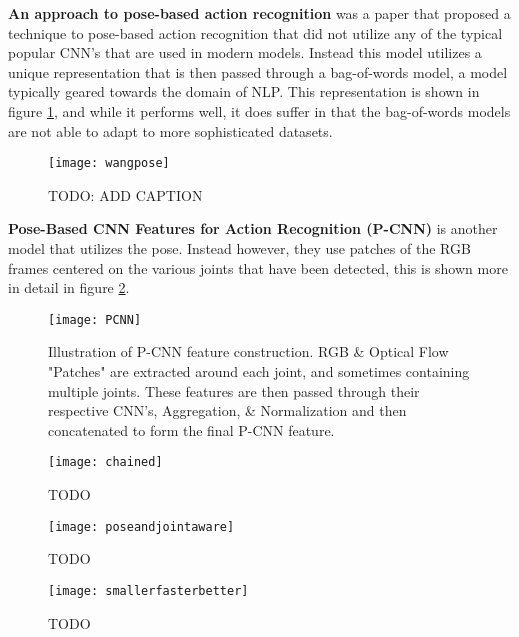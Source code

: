 \textbf{An approach to pose-based action recognition} \cite{WangPose} was a paper that proposed a technique to pose-based action recognition that did not utilize any of the typical popular CNN's that are used in modern models. Instead this model utilizes a unique representation that is then passed through a bag-of-words model, a model typically geared towards the domain of NLP. This representation is shown in figure \ref{fig:wangpose}, and  while it performs well, it does suffer in that the bag-of-words models are not able to adapt to more sophisticated datasets.

\begin{figure}[h]
	\texttt{[image: wangpose]}
	\centering
	\caption{TODO: ADD CAPTION}
	\label{fig:wangpose}
\end{figure}

\textbf{Pose-Based CNN Features for Action Recognition (P-CNN)} \cite{PCNN} is another model that utilizes the pose. Instead however, they use patches of the RGB frames centered on the various joints that have been detected, this is shown more in detail in figure \ref{fig:pcnn}.

\begin{figure}[h]
	\texttt{[image: PCNN]}
	\centering
	\caption{Illustration of P-CNN feature construction. RGB \& Optical Flow "Patches" are extracted around each joint, and sometimes containing multiple joints. These features are then passed through their respective CNN's, Aggregation, \& Normalization and then concatenated to form the final P-CNN feature.}
	\label{fig:pcnn}
\end{figure}

\cite{Chained}

\begin{figure}[h]
	\texttt{[image: chained]}
	\centering
	\caption{TODO}
	\label{fig:chained}
\end{figure}

\cite{poseandjointaware}

\begin{figure}[h]
	\texttt{[image: poseandjointaware]}
	\centering
	\caption{TODO}
	\label{fig:poseandjointaware}
\end{figure}

\cite{smaller_faster_better}

\begin{figure}[h]
	\texttt{[image: smallerfasterbetter]}
	\centering
	\caption{TODO}
	\label{fig:smallerfasterbetter}
\end{figure}

